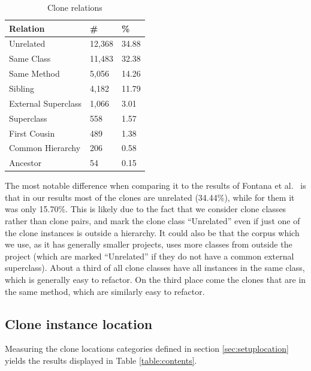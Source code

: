 \begin{table}[H]
  \begin{center}
  \caption{Clone relations} \label{table:relations}
  \medskip
\begin{tabular}{|l|l|l|} \hline
\textbf{Relation} & \textbf{\#} & \textbf{\%} \\ \hline
Unrelated          & 12,368 & 34.88            \\ \hline
Same Class          & 11,483 & 32.38             \\ \hline
Same Method               & 5,056 & 14.26            \\ \hline
Sibling         & 4,182 & 11.79             \\ \hline
External Superclass   & 1,066 & 3.01             \\ \hline
Superclass          & 558 & 1.57           \\ \hline
First Cousin          & 489 & 1.38           \\ \hline
Common Hierarchy    & 206 & 0.58            \\ \hline
Ancestor          & 54 & 0.15          \\ \hline
\end{tabular}
\end{center}
\end{table}

The most notable difference when comparing it to the results of Fontana et al.~\cite{fontana2015duplicated} is that in our results most of the clones are unrelated (34.44\%), while for them it was only 15.70\%. This is likely due to the fact that we consider clone classes rather than clone pairs, and mark the clone class ``Unrelated'' even if just one of the clone instances is outside a hierarchy. It could also be that the corpus which we use, as it has generally smaller projects, uses more classes from outside the project (which are marked ``Unrelated'' if they do not have a common external superclass). About a third of all clone classes have all instances in the same class, which is generally easy to refactor. On the third place come the clones that are in the same method, which are similarly easy to refactor.

\subsection{Clone instance location}\label{chap:clonelocation}
Measuring the clone locations categories defined in section \ref{sec:setuplocation} yields the results displayed in Table \ref{table:contents}.

